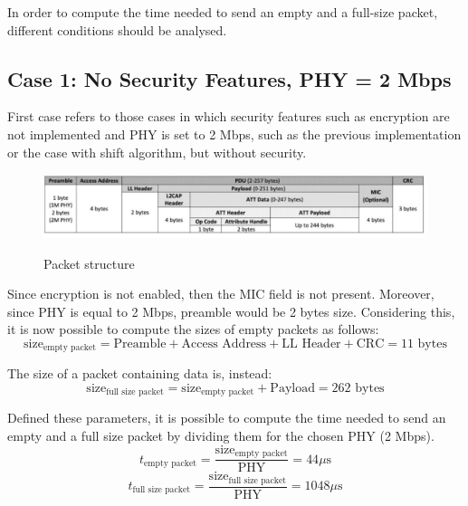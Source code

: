 \documentclass{Configuration_Files/PoliMi3i_thesis}
\begin{document}
In order to compute the time needed to send an empty and a full-size packet, different conditions should be analysed.

\subsection*{Case 1: No Security Features, PHY = 2 Mbps}

First case refers to those cases in which security features such as encryption are not implemented and PHY is set to 2 Mbps, such as the previous implementation or the case with shift algorithm, but without security.

\begin{figure}[h]
    \centering
    \includegraphics[scale=0.3]{theoretical_throughput.png}
    \label{theoretical_1}
    \caption{Packet structure}
\end{figure}

Since encryption is not enabled, then the MIC field is not present. Moreover, since PHY is equal to 2 Mbps, preamble would be 2 bytes size. Considering this, it is now possible to compute the sizes of empty packets as follows:
\begin{equation}
\text{size}_{\text{empty packet}} = \text{Preamble} + \text{Access Address} + \text{LL Header} + \text{CRC} = 11 \text{ bytes}
\label{eq:size_empty_packet}
\end{equation}

The size of a packet containing data is, instead:
\begin{equation}
\text{size}_{\text{full size packet}} = \text{size}_{\text{empty packet}} + \text{Payload} = 262 \text{ bytes}
\label{eq:size_full_size_packet}
\end{equation}

Defined these parameters, it is possible to compute the time needed to send an empty and a full size packet by dividing them for the chosen PHY (2 Mbps).
\begin{equation}
t_{\text{empty packet}} = \frac{\text{size}_{\text{empty packet}}}{\text{PHY}} = 44 \mu \text{s}
\label{eq:t_empty_packet}
\end{equation}
\begin{equation}
t_{\text{full size packet}} = \frac{\text{size}_{\text{full size packet}}}{\text{PHY}} = 1048 \mu \text{s}
\label{eq:t_full_size_packet}
\end{equation}
\end{document}
